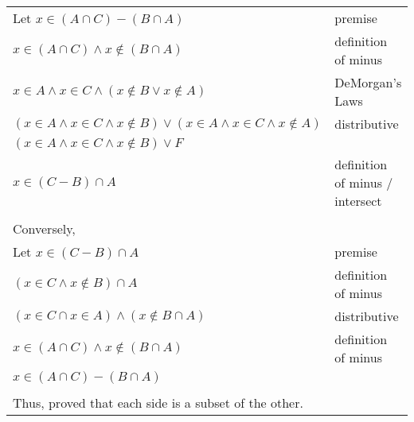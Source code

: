 \documentclass[12pt]{exam}
\begin{document}
\begin{solution}
	\begin{tabular}{ll}
		Let $x\in (A \cap C) - (B \cap A)$                                                 & premise                         \\
		$x\in (A \cap C) \land x\notin (B \cap A)$                                         & definition of minus             \\
		$x\in A \land x\in C \land (x\notin B \lor x\notin A)$                             & DeMorgan's Laws                 \\
		$(x\in A \land x\in C \land x\notin B) \lor (x\in A \land x\in C \land x\notin A)$ & distributive                    \\
		$(x\in A \land x\in C \land x\notin B) \lor F$                                     &                                 \\
		$x\in (C-B)\cap A$                                                                 & definition of minus / intersect \\

		\\Conversely,\\
		Let $x\in (C-B)\cap A$                                                             & premise                         \\
		$(x\in C \land x\notin B)\cap A$                                                   & definition of minus             \\
		$(x\in C \cap x \in A) \land (x\notin B \cap A) $                                  & distributive                    \\
		$x\in (A \cap C) \land x\notin (B \cap A)$                                         & definition of minus             \\
		$x\in (A \cap C) - (B \cap A)$                                                                                       \\


		\\Thus, proved that each side is a subset of the other.
	\end{tabular}
\end{solution}
\end{document}
